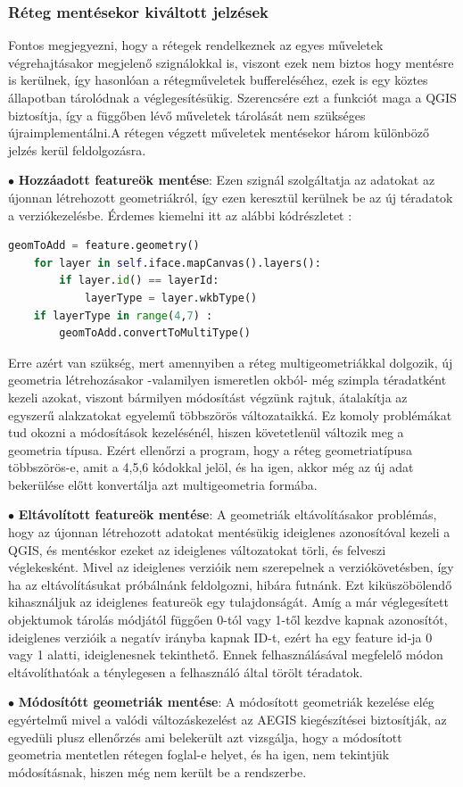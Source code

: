 \subsubsection{Réteg mentésekor kiváltott jelzések}
Fontos megjegyezni, hogy a rétegek rendelkeznek az egyes műveletek végrehajtásakor megjelenő szignálokkal is, viszont ezek nem biztos hogy mentésre is kerülnek, így hasonlóan a rétegműveletek buffereléséhez, ezek is egy köztes állapotban tárolódnak a véglegesítésükig. Szerencsére ezt a funkciót maga a QGIS biztosítja, így a függőben lévő műveletek tárolását nem szükséges újraimplementálni.A rétegen végzett műveletek mentésekor három különböző jelzés kerül feldolgozásra.
\begin{list}{}{}
	\item $\bullet$ \textbf{Hozzáadott featureök mentése}: Ezen szignál szolgáltatja az adatokat az újonnan létrehozott geometriákról, így ezen keresztül kerülnek be az új téradatok a verziókezelésbe. Érdemes kiemelni itt az alábbi kódrészletet : 
	\begin{lstlisting}[language={python}]
	geomToAdd = feature.geometry()
	for layer in self.iface.mapCanvas().layers():
		if layer.id() == layerId:
			layerType = layer.wkbType()
	if layerType in range(4,7) :
		geomToAdd.convertToMultiType()
	\end{lstlisting}
	Erre azért van szükség, mert amennyiben a réteg multigeometriákkal dolgozik, új geometria létrehozásakor -valamilyen ismeretlen okból- még szimpla téradatként kezeli azokat, viszont bármilyen módosítást végzünk rajtuk, átalakítja az egyszerű alakzatokat egyelemű többszörös változataikká. Ez komoly problémákat tud okozni a módosítások kezelésénél, hiszen követetlenül változik meg a geometria típusa. Ezért ellenőrzi a program, hogy a réteg geometriatípusa többszörös-e, amit a 4,5,6 kódokkal jelöl, és ha igen, akkor még az új adat bekerülése előtt konvertálja azt multigeometria formába.
	\item $\bullet$ \textbf{Eltávolított featureök mentése}: A geometriák eltávolításakor problémás, hogy az újonnan létrehozott adatokat mentésükig ideiglenes azonosítóval kezeli a QGIS, és mentéskor ezeket az ideiglenes változatokat törli, és felveszi véglekesként. Mivel az ideiglenes verzióik nem szerepelnek a verziókövetésben, így ha az eltávolításukat próbálnánk feldolgozni, hibára futnánk. Ezt kiküszöbölendő kihasználjuk az ideiglenes featureök egy tulajdonságát. Amíg a már véglegesített objektumok tárolás módjától függően 0-tól vagy 1-től kezdve kapnak azonosítót, ideiglenes verzióik a negatív irányba kapnak ID-t, ezért ha egy feature id-ja 0 vagy 1 alatti, ideiglenesnek tekinthető. Ennek felhasználásával megfelelő módon eltávolíthatóak a ténylegesen a felhasználó által törölt téradatok.
	\item $\bullet$ \textbf{Módosítótt geometriák mentése}: A módosított geometriák kezelése elég egyértelmű mivel a valódi változáskezelést az AEGIS kiegészítései biztosítják, az egyedüli plusz ellenőrzés ami belekerült azt vizsgálja, hogy a módosított geometria mentetlen rétegen foglal-e helyet, és ha igen, nem tekintjük módosításnak, hiszen még nem került be a rendszerbe.

\end{list}
